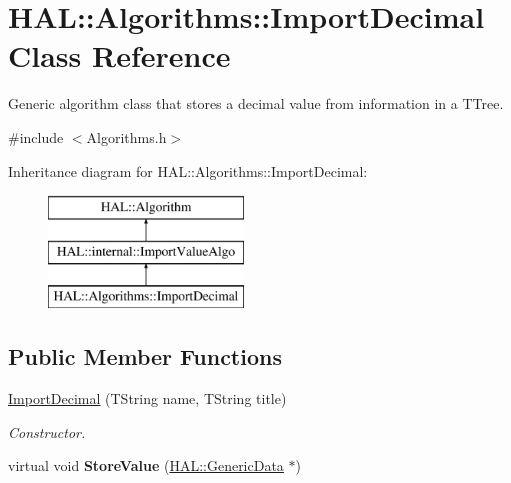 \hypertarget{class_h_a_l_1_1_algorithms_1_1_import_decimal}{\section{H\+A\+L\+:\+:Algorithms\+:\+:Import\+Decimal Class Reference}
\label{class_h_a_l_1_1_algorithms_1_1_import_decimal}
}


Generic algorithm class that stores a decimal value from information in a T\+Tree.  




{\ttfamily \#include $<$Algorithms.\+h$>$}

Inheritance diagram for H\+A\+L\+:\+:Algorithms\+:\+:Import\+Decimal\+:\begin{figure}[H]
\begin{center}
\leavevmode
\includegraphics[height=3.000000cm]{class_h_a_l_1_1_algorithms_1_1_import_decimal}
\end{center}
\end{figure}
\subsection*{Public Member Functions}
\begin{DoxyCompactItemize}
\item 
\hyperlink{class_h_a_l_1_1_algorithms_1_1_import_decimal_a15781bef55e9a3ff8de1ec1f64a94ff5}{Import\+Decimal} (T\+String name, T\+String title)
\begin{DoxyCompactList}\small\item\em Constructor. \end{DoxyCompactList}\item 
\hypertarget{class_h_a_l_1_1_algorithms_1_1_import_decimal_a3044dabc75bee09871d80f32333e730f}{virtual void {\bfseries Store\+Value} (\hyperlink{class_h_a_l_1_1_generic_data}{H\+A\+L\+::\+Generic\+Data} $\ast$)}\label{class_h_a_l_1_1_algorithms_1_1_import_decimal_a3044dabc75bee09871d80f32333e730f}

\end{DoxyCompactItemize}


